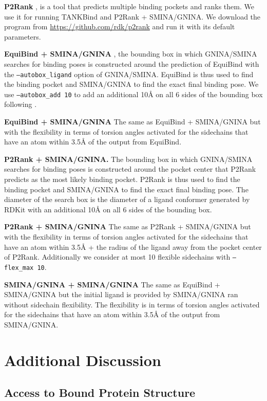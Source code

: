 \documentclass{article} \usepackage{iclr2023_conference,times}
\newcommand{\new}[1]{#1}
\begin{document}
\textbf{P2Rank} \citep{krivak2018p2rank}, is a tool that predicts multiple binding pockets and ranks them. We use it for running TANKBind and P2Rank + SMINA/GNINA. We download the program from \url{https://github.com/rdk/p2rank} and run it with its default parameters.

\textbf{EquiBind + SMINA/GNINA} \citep{equibind}, the bounding box in which GNINA/SMINA searches for binding poses is constructed around the prediction of EquiBind with the \texttt{--autobox\_ligand} option of GNINA/SMINA. EquiBind is thus used to find the binding pocket and SMINA/GNINA to find the exact final binding pose. We use \texttt{--autobox\_add 10} to add an additional 10\AA{} on all 6 sides of the bounding box following \citep{equibind}.

\textbf{EquiBind + SMINA/GNINA} The same as EquiBind + SMINA/GNINA but with the flexibility in terms of torsion angles activated for the sidechains that have an atom within 3.5\AA{} of the output from EquiBind.

\textbf{P2Rank + SMINA/GNINA.} The bounding box in which GNINA/SMINA searches for binding poses is constructed around the pocket center that P2Rank predicts as the most likely binding pocket. P2Rank is thus used to find the binding pocket and SMINA/GNINA to find the exact final binding pose. The diameter of the search box is the diameter of a ligand conformer generated by RDKit with an additional 10\AA{} on all 6 sides of the bounding box.

\textbf{P2Rank + SMINA/GNINA} The same as P2Rank + SMINA/GNINA but with the flexibility in terms of torsion angles activated for the sidechains that have an atom within 3.5\AA{} + the radius of the ligand away from the pocket center of P2Rank. Additionally we consider at most 10 flexible sidechains with \texttt{--flex\_max 10}.

\textbf{SMINA/GNINA + SMINA/GNINA} The same as EquiBind + SMINA/GNINA but the initial ligand is provided by SMINA/GNINA ran without sidechain flexibility. The flexibility is in terms of torsion angles activated for the sidechains that have an atom within 3.5\AA{} of the output from SMINA/GNINA.

\section{\new{Additional Discussion}} \label{appx:discussion}

\subsection{\new{Access to Bound Protein Structure}}\label{appx:apo_holo}
\end{document}
